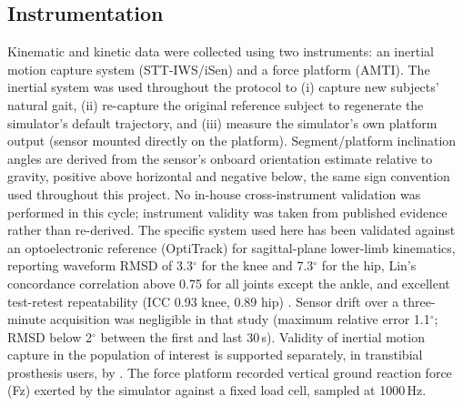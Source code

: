 \documentclass[journal,twocolumn,letterpaper]{IEEEJERM}
\begin{document}
\subsection*{Instrumentation}

Kinematic and kinetic data were collected using two instruments: an
inertial motion capture system (STT-IWS/iSen) and a force platform
(AMTI). The inertial system was used throughout the protocol to (i)
capture new subjects' natural gait, (ii) re-capture the original
reference subject to regenerate the simulator's default trajectory, and
(iii) measure the simulator's own platform output (sensor mounted
directly on the platform). Segment/platform inclination angles are
derived from the sensor's onboard orientation estimate relative to
gravity, positive above horizontal and negative below, the same sign
convention used throughout this project. No in-house cross-instrument
validation was performed in this cycle; instrument validity was taken
from published evidence rather than re-derived. The specific system used
here has been validated against an optoelectronic reference (OptiTrack)
for sagittal-plane lower-limb kinematics, reporting waveform RMSD of
3.3$^\circ$ for the knee and 7.3$^\circ$ for the hip, Lin's concordance
correlation above 0.75 for all joints except the ankle, and excellent
test-retest repeatability (ICC 0.93 knee, 0.89 hip)
\cite{Piche2022iSenValidity}. Sensor drift over a three-minute
acquisition was negligible in that study (maximum relative error
1.1$^\circ$; RMSD below 2$^\circ$ between the first and last 30\,s).
Validity of inertial motion capture in the population of interest is
supported separately, in transtibial prosthesis users, by
\cite{Rattanakoch2023TranstibialIMU}.
The
force platform recorded vertical ground reaction force (Fz) exerted by
the simulator against a fixed load cell, sampled at 1000\,Hz.
\end{document}
